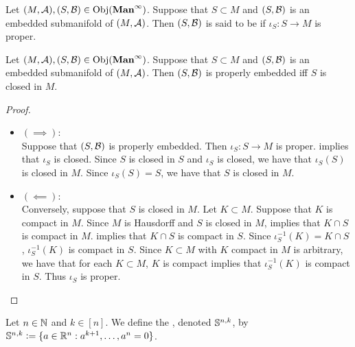\documentclass{book}
\begin{document}
	\begin{defn} 
		Let $(M, \MA), (S, \MB) \in \Obj(\bManinf)$. Suppose that $S \subset M$ and $(S, \MB)$ is an embedded submanifold of $(M, \MA)$. Then $(S, \MB)$ is said to be  if $\iota_S:S \rightarrow M$ is proper.
	\end{defn}

	\begin{ex} 
		Let $(M, \MA), (S, \MB) \in \Obj(\bManinf)$. Suppose that $S \subset M$ and $(S, \MB)$ is an embedded submanifold of $(M, \MA)$. Then $(S, \MB)$ is properly embedded iff $S$ is closed in $M$. 
	\end{ex}

	\begin{proof}\
		\begin{itemize}
			\item $(\implies):$ \\
			Suppose that $(S, \MB)$ is properly embedded. Then $\iota_S:S \rightarrow M$ is proper.  implies that $\iota_S$ is closed. Since $S$ is closed in $S$ and $\iota_S$ is closed, we have that $\iota_S(S)$ is closed in $M$. Since $\iota_S(S) = S$, we have that $S$ is closed in $M$. 
			\item $(\impliedby):$ \\
			Conversely, suppose that $S$ is closed in $M$. Let $K \subset M$. Suppose that $K$ is compact in $M$. Since $M$ is Hausdorff and $S$ is closed in $M$,  implies that $K \cap S$ is compact in $M$.  implies that $K \cap S$ is compact in $S$. Since $\iota_S^{-1}(K) = K \cap S$, $\iota_S^{-1}(K)$ is compact in $S$. Since $K \subset M$ with $K$ compact in $M$ is arbitrary, we have that for each $K \subset M$, $K$ is compact implies that $\iota_S^{-1}(K)$ is compact in $S$. Thus $\iota_S$ is proper. 
		\end{itemize}
	\end{proof}

	\begin{defn}  
		Let $n \in \N$ and $k \in [n]$. We define the , denoted $\S^{n,k}$, by $\S^{n,k} \defeq \{a \in \R^n : a^{k+1}, \ldots, a^n = 0\}$.
	\end{defn}
	
\end{document}
